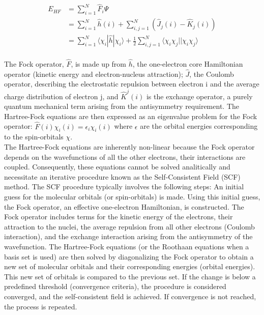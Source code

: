 \begin{equation}\label{EHF}
    \begin{aligned}
        E_{HF} &= \sum_{i=1}^{N} \hat{F}_i \Psi \\
            &= \sum_{i=1}^{N} \hat{h}(i) + \sum_{i,j=1}^{N} (\hat{J}_j(i) - \hat{K}_j(i)) \\ 
            &= \sum_{i=1}^{N} \langle \chi_i | \hat{h} | \chi_i \rangle + \frac{1}{2} \sum_{i,j=1}^{N} \langle \chi_i \chi_j || \chi_i \chi_j \rangle
    \end{aligned}
\end{equation}
\\
The Fock operator, $\hat{F}$, is made up from $\hat{h}$, the one-electron core Hamiltonian operator (kinetic energy and electron-nucleus attraction); $\hat{J}$, the Coulomb operator, describing the electrostatic repulsion between electron i and the average charge distribution of electron j, and $\hat{K}^j(i)$ is the exchange operator, a purely quantum mechanical term arising from the antisymmetry requirement. The Hartree-Fock equations are then expressed as an eigenvalue problem for the Fock operator:
$ \hat{F}(i) \chi_i(i) = \epsilon_i \chi_i(i) $
where $\epsilon$ are the orbital energies corresponding to the spin-orbitals $\chi$.\\

The Hartree-Fock equations are inherently non-linear because the Fock operator depends on the wavefunctions of all the other electrons, their interactions are coupled. Consequently, these equations cannot be solved analitically and necessitate an iterative procedure known as the Self-Consistent Field (SCF) method. The SCF procedure typically involves the following steps: An initial guess for the molecular orbitals (or spin-orbitals) is made. Using this initial guess, the Fock operator, an effective one-electron Hamiltonian, is constructed. The Fock operator includes terms for the kinetic energy of the electrons, their attraction to the nuclei, the average repulsion from all other electrons (Coulomb interaction), and the exchange interaction arising from the antisymmetry of the wavefunction. The Hartree-Fock equations (or the Roothaan equations when a basis set is used) are then solved by diagonalizing the Fock operator to obtain a new set of molecular orbitals and their corresponding energies (orbital energies). This new set of orbitals is compared to the previous set. If the change is below a predefined threshold (convergence criteria), the procedure is considered converged, and the self-consistent field is achieved. If convergence is not reached, the process is repeated.

